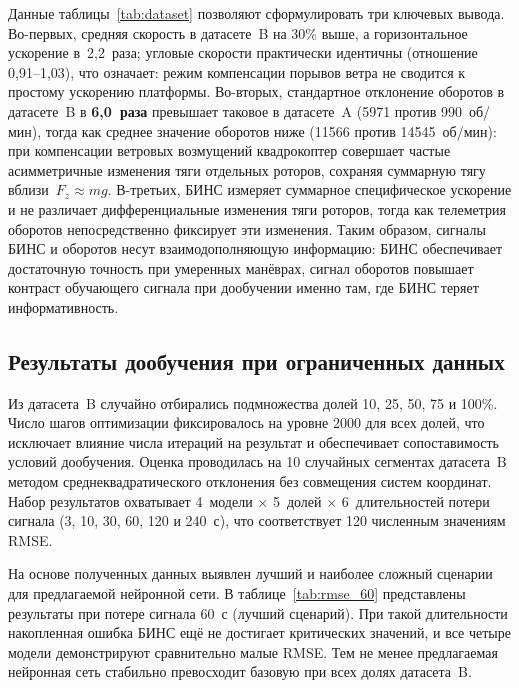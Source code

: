 Данные таблицы~\ref{tab:dataset} позволяют сформулировать три ключевых вывода.
Во-первых, средняя скорость в датасете~B на 30\% выше, а горизонтальное
ускорение в~2{,}2~раза; угловые скорости практически идентичны
(отношение 0{,}91--1{,}03), что означает: режим компенсации порывов ветра
не сводится к простому ускорению платформы.
Во-вторых, стандартное отклонение оборотов в датасете~B в \textbf{6{,}0~раза}
превышает таковое в датасете~A (5971 против 990~об/мин), тогда как среднее
значение оборотов ниже (11566 против 14545~об/мин): при компенсации ветровых
возмущений квадрокоптер совершает частые асимметричные изменения тяги
отдельных роторов, сохраняя суммарную тягу вблизи~$F_z \approx mg$.
В-третьих, БИНС измеряет суммарное специфическое ускорение и не различает
дифференциальные изменения тяги роторов, тогда как телеметрия оборотов
непосредственно фиксирует эти изменения.
Таким образом, сигналы БИНС и оборотов несут взаимодополняющую информацию:
БИНС обеспечивает достаточную точность при умеренных манёврах, сигнал оборотов
повышает контраст обучающего сигнала при дообучении именно там, где БИНС
теряет информативность.

\subsection{Результаты дообучения при ограниченных данных}
\label{sec:exp2}

Из датасета~B случайно отбирались подмножества долей 10, 25, 50, 75 и 100\%.
Число шагов оптимизации фиксировалось на уровне 2000 для всех долей,
что исключает влияние числа итераций на результат и обеспечивает
сопоставимость условий дообучения.
Оценка проводилась на 10 случайных сегментах датасета~B методом
среднеквадратического отклонения без совмещения систем координат.
Набор результатов охватывает 4~модели $\times$ 5~долей $\times$ 6~длительностей
потери сигнала (3, 10, 30, 60, 120 и 240~с), что соответствует 120 численным
значениям RMSE.

На основе полученных данных выявлен лучший и наиболее сложный сценарии для
предлагаемой нейронной сети.
В таблице~\ref{tab:rmse_60} представлены результаты при потере сигнала 60~с
(лучший сценарий).
При такой длительности накопленная ошибка БИНС ещё не достигает критических
значений, и все четыре модели демонстрируют сравнительно малые RMSE.
Тем не менее предлагаемая нейронная сеть стабильно превосходит базовую при
всех долях датасета~B.

